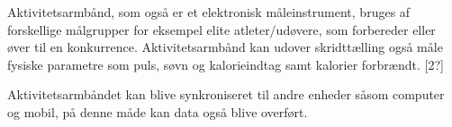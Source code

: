 Aktivitetsarmbånd, som også er et elektronisk måleinstrument, bruges af forskellige målgrupper for eksempel elite atleter/udøvere, som forbereder eller øver til en konkurrence. Aktivitetsarmbånd kan udover skridttælling også måle fysiske parametre som puls, søvn og kalorieindtag samt kalorier forbrændt. [2?] 

Aktivitetsarmbåndet kan blive synkroniseret til andre enheder såsom computer og mobil, på denne måde kan data også blive overført. 







